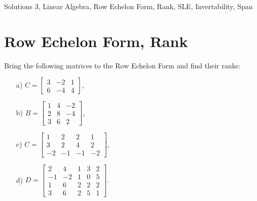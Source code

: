  \begin{center}\begin{large}Solutions 3, Linear Algebra, Row Echelon Form, Rank, SLE, Invertability, Span\end{large}\end{center}
 \bigskip

\tableofcontents

\section{Row Echelon Form, Rank}
\begin{problem}%
    Bring the following matrices to the Row Echelon Form and find their ranks:

    \begin{enumerate}
        \item[a) ] $C=\begin{bmatrix}3&-2&1\\6&-4&4\end{bmatrix}$,
        
        \item[b) ] $B=\begin{bmatrix}1&4&-2\\2&8&-4\\3&6&2\end{bmatrix}$,
        
        \item[c) ] $C=\begin{bmatrix}1&2&2&1\\3&2&4&2\\-2&-1&-1&-2\end{bmatrix}$,
        
        \item[d) ] $D=\begin{bmatrix}2&4&1&3&2\\-1&-2&1&0&5\\1&6&2&2&2\\3&6&2&5&1\end{bmatrix}$.
    \end{enumerate}
\end{problem}
